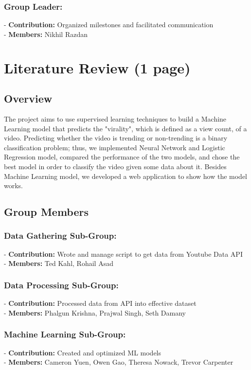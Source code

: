 \documentclass{article}
\begin{document}
\subsubsection*{Group Leader:}
- \textbf{Contribution:} Organized milestones and facilitated communication \\
- \textbf{Members:} Nikhil Razdan

\section*{Literature Review (1 page)}
\subsection*{Overview}
The project aims to use supervised learning techniques to build a Machine Learning model that predicts the "virality", which is defined as a view count, of a video. Predicting whether the video is trending or non-trending is a binary classification problem; thus, we implemented Neural Network and Logistic Regression model, compared the performance of the two models, and chose the best model in order to classify the video given some data about it. Besides Machine Learning model, we developed a web application to show how the model works. 

\subsection*{Group Members}
\subsubsection*{Data Gathering Sub-Group:}
- \textbf{Contribution:} Wrote and manage script to get data from Youtube Data API \\
- \textbf{Members:} Ted Kahl, Rohail Asad
\subsubsection*{Data Processing Sub-Group:}
- \textbf{Contribution:} Processed data from API into effective dataset \\
- \textbf{Members:} Phalgun Krishna, Prajwal Singh, Seth Damany
\subsubsection*{Machine Learning Sub-Group:}
- \textbf{Contribution:} Created and optimized ML models \\
- \textbf{Members:} Cameron Yuen, Owen Gao, Theresa Nowack, Trevor Carpenter
\end{document}
